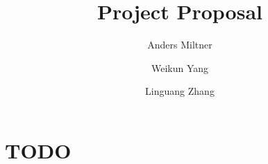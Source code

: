 \documentclass[12pt]{article}
\begin{document}
 
\title{Project Proposal}
\author{Anders Miltner
\and
Weikun Yang
\and
Linguang Zhang}
\maketitle
 
\section{TODO}
\end{document}

